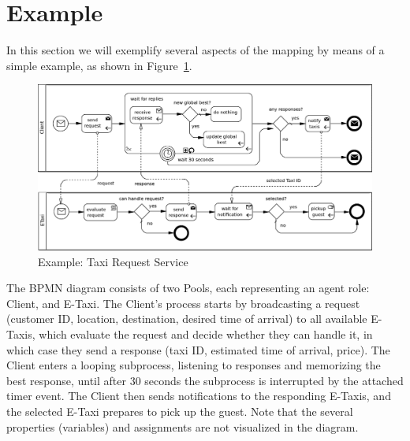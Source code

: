 

\section{Example}
\label{sec:example}

In this section we will exemplify several aspects of the mapping by means of a
simple example, as shown in Figure~\ref{fig:example}.

\begin{figure}
	\includegraphics[width=\textwidth]{img/example.png}
	\caption{Example: Taxi Request Service}
	\label{fig:example}
\end{figure}

The BPMN diagram consists of two Pools, each representing an agent role: Client,
and E-Taxi.  The Client's process starts by broadcasting a request (customer ID,
location, destination, desired time of arrival) to all available E-Taxis, which
evaluate the request and decide whether they can handle it, in which case they
send a response (taxi ID, estimated time of arrival, price).  The Client enters
a looping subprocess, listening to responses and memorizing the best response,
until after 30 seconds the subprocess is interrupted by the attached timer event.
The Client then sends notifications to the responding E-Taxis, and the selected
E-Taxi prepares to pick up the guest.  Note that the several properties (variables)
and assignments are not visualized in the diagram.

